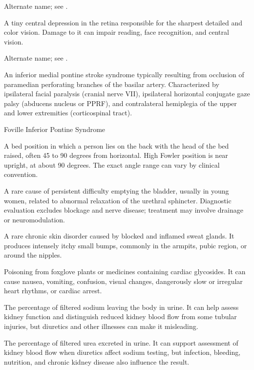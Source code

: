  Alternate name; see .

 A tiny central depression in the retina responsible for the sharpest detailed and color vision. Damage to it can impair reading, face recognition, and central vision.

 Alternate name; see .

 An inferior medial pontine stroke syndrome typically resulting from occlusion of paramedian perforating branches of the basilar artery. Characterized by ipsilateral facial paralysis (cranial nerve VII), ipsilateral horizontal conjugate gaze palsy (abducens nucleus or PPRF), and contralateral hemiplegia of the upper and lower extremities (corticospinal tract).

\synonyms
Foville Inferior Pontine Syndrome

 A bed position in which a person lies on the back with the head of the bed raised, often 45 to 90 degrees from horizontal. High Fowler position is near upright, at about 90 degrees. The exact angle range can vary by clinical convention.

 A rare cause of persistent difficulty emptying the bladder, usually in young women, related to abnormal relaxation of the urethral sphincter. Diagnostic evaluation excludes blockage and nerve disease; treatment may involve drainage or neuromodulation.

 A rare chronic skin disorder caused by blocked and inflamed sweat glands. It produces intensely itchy small bumps, commonly in the armpits, pubic region, or around the nipples.

 Poisoning from foxglove plants or medicines containing cardiac glycosides. It can cause nausea, vomiting, confusion, visual changes, dangerously slow or irregular heart rhythms, or cardiac arrest.

 The percentage of filtered sodium leaving the body in urine. It can help assess kidney function and distinguish reduced kidney blood flow from some tubular injuries, but diuretics and other illnesses can make it misleading.

 The percentage of filtered urea excreted in urine. It can support assessment of kidney blood flow when diuretics affect sodium testing, but infection, bleeding, nutrition, and chronic kidney disease also influence the result.

